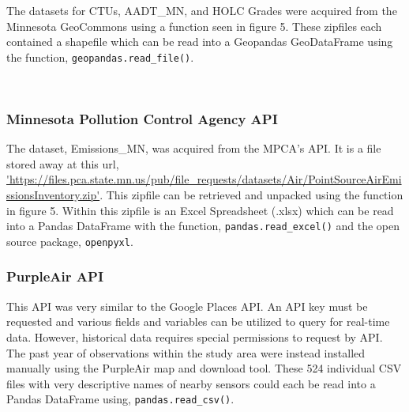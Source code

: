 \documentclass[article,12pt]{article}
\numberwithin{equation}{section}
\begin{document}
The datasets for CTUs, AADT\_MN, and HOLC Grades were acquired from the Minnesota GeoCommons using a function seen in figure 5. These zipfiles each contained a shapefile which can be read into a Geopandas GeoDataFrame using the function, \texttt{geopandas.read\_file()}.

\begin{adjustwidth}{-.88in}{-.88in}
	\begin{center}
		\\
		
	\end{center}
\end{adjustwidth}
\vspace{.5in}

\subsubsection{Minnesota Pollution Control Agency API}

The dataset, Emissions\_MN, was acquired from the MPCA's API. It is a file stored away at this url, \url{'https://files.pca.state.mn.us/pub/file_requests/datasets/Air/PointSourceAirEmissionsInventory.zip'}. This zipfile can be retrieved and unpacked using the function in figure 5.  Within this zipfile is an Excel Spreadsheet (.xlsx) which can be read into a Pandas DataFrame with the function, \texttt{pandas.read\_excel()} and the open source package, \texttt{openpyxl}. 

\subsubsection{PurpleAir API}

This API was very similar to the Google Places API. An API key must be requested and various fields and variables can be utilized to query for real-time data. However, historical data requires special permissions to request by API. The past year of observations within the study area were instead installed manually using the PurpleAir map and download tool. These 524 individual CSV files with very descriptive names of nearby sensors could each be read into a Pandas DataFrame using, \texttt{pandas.read\_csv()}.
\end{document}
